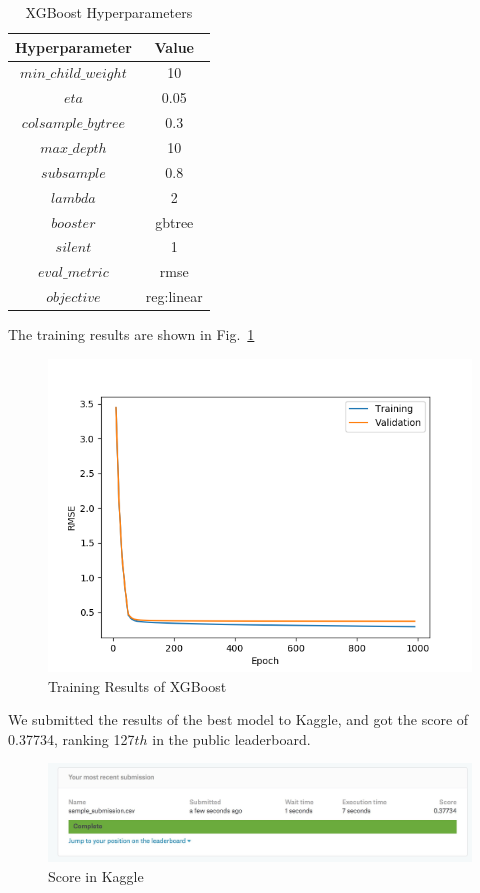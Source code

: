 \begin{table}[!htbp]
	\caption{XGBoost Hyperparameters}
	\label{tab:xgboost}
	\begin{tabular}{cc}
		\toprule
		Hyperparameter & Value \\
		\midrule
		$min\_child\_weight$ & 10\\
		$eta$ & 0.05\\
		$colsample\_bytree$ & 0.3\\
		$max\_depth$ & 10\\
		$subsample$ & 0.8\\
		$lambda$ & 2\\
		$booster$ & gbtree\\
		$silent$ & 1\\
		$eval\_metric$ & rmse\\
		$objective$ & reg:linear\\
		\bottomrule
	\end{tabular}
	\label{tab:dataset}
\end{table}

The training results are shown in Fig.~\ref{fig:xgboost1}

\begin{figure}[!htbbp]
	\centering
	\includegraphics[width=\linewidth]{x1.png}
	\caption{Training Results of XGBoost}
	\label{fig:xgboost1}
\end{figure}

We submitted the results of the best model to Kaggle, and got the score of 0.37734, ranking 127$th$ in the public leaderboard.

\begin{figure}[!htbp]
	\centering
	\includegraphics[width=\linewidth]{score.jpg}
	\caption{Score in Kaggle}
\end{figure}

